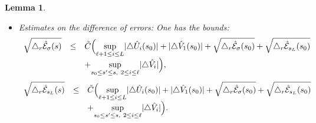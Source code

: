 \documentclass[11pt,a4paper,reqno]{amsart}
\newtheorem{lemma}[theorem]{Lemma}
\theoremstyle{remark}
\numberwithin{equation}{section}
\begin{document}
\begin{lemma}
\begin{itemize}
\item[(ii)] \emph{Estimates on the difference of errors:} One has the bounds:
\begin{equation} \label{variete:eq:bootstrap triangle varepsilon low}
\begin{array}{r c l}
\sqrt{\triangle_r \hat{\mathcal{E}}_{\sigma}(s)}  &\leq& \tilde{C}\Bigl{(} \underset{\ell+1\leq i \leq L}{\text{sup}}|\triangle \hat{U}_i(s_0)| + |\triangle \hat{V}_1(s_0)|+\sqrt{\triangle_r \hat{\mathcal{E}}_{\sigma}(s_0)}+\sqrt{\triangle_r \hat{\mathcal{E}}_{s_L}(s_0)}\\
&&+  \underset{s_0\leq s' \leq s, \ 2\leq i \leq \ell}{\text{sup}}|\triangle \hat{V}_i|\Bigr{)},
\end{array}
\end{equation}
\begin{equation} \label{variete:eq:bootstrap triangle varepsilon high}
\begin{array}{r c l}
\sqrt{\triangle_r \hat{\mathcal{E}}_{s_L}(s)} &\leq& \tilde{C}\Bigl{(} \underset{\ell+1\leq i \leq L}{\text{sup}}|\triangle \hat{U}_i(s_0)| + |\triangle \hat{V}_1(s_0)|+\sqrt{\triangle_r \hat{\mathcal{E}}_{\sigma}(s_0)}+\sqrt{\triangle_r \hat{\mathcal{E}}_{s_L}(s_0)}\\
&&+  \underset{s_0\leq s' \leq s, \ 2\leq i \leq \ell}{\text{sup}}|\triangle \hat{V}_i|\Bigr{)}.
\end{array}
\end{equation}
\end{itemize}

\end{lemma}
\end{document}
